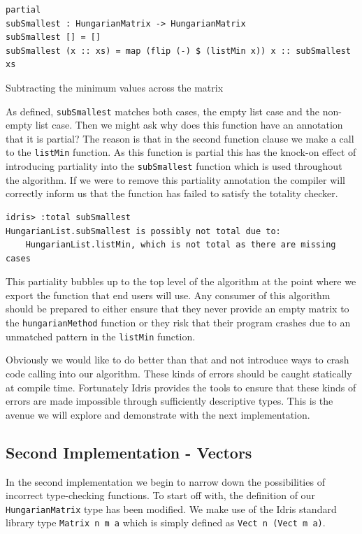 \documentclass[a4paper, notitlepage]{report}
\begin{document}
\begin{listing}[H]
\begin{verbatim}
partial
subSmallest : HungarianMatrix -> HungarianMatrix
subSmallest [] = []
subSmallest (x :: xs) = map (flip (-) $ (listMin x)) x :: subSmallest xs
\end{verbatim}
\caption{Subtracting the minimum values across the matrix}
\end{listing}

As defined, \texttt{subSmallest} matches both cases, the empty list case and the
non-empty list case. Then we might ask why does this function have an annotation
that it is partial? The reason is that in the second function clause we make a
call to the \texttt{listMin} function. As this function is partial this has the knock-on
effect of introducing partiality into the \texttt{subSmallest} function which is used
throughout the algorithm. If we were to remove this partiality annotation the
compiler will correctly inform us that the function has failed to satisfy the
totality checker.

\begin{verbatim}
idris> :total subSmallest
HungarianList.subSmallest is possibly not total due to:
    HungarianList.listMin, which is not total as there are missing cases
\end{verbatim}

This partiality bubbles up to the top level of the algorithm at the point where
we export the function that end users will use. Any consumer of this algorithm
should be prepared to either ensure that they never provide an empty matrix to
the \texttt{hungarianMethod} function or they risk that their program crashes due to an
unmatched pattern in the \texttt{listMin} function.

Obviously we would like to do better than that and not introduce ways to crash
code calling into our algorithm. These kinds of errors should be caught
statically at compile time. Fortunately Idris provides the tools to ensure that
these kinds of errors are made impossible through sufficiently descriptive
types. This is the avenue we will explore and demonstrate with the next
implementation.

\subsection{Second Implementation - Vectors}
\label{sec:org182769a}
In the second implementation we begin to narrow down the possibilities of
incorrect type-checking functions. To start off with, the definition of our
\texttt{HungarianMatrix} type has been modified. We make use of the Idris standard
library type \texttt{Matrix n m a} which is simply defined as \texttt{Vect n (Vect m a)}.
\end{document}
